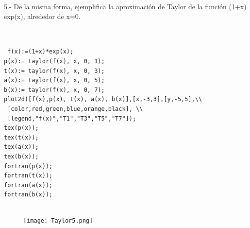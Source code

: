 \documentclass[12pt]{article}
\begin{document}
5.- De la misma forma, ejemplifica la aproximación de Taylor de la función
 (1+x) exp(x), alrededor de x=0.\\
 \begin{verbatim}


 f(x):=(1+x)*exp(x);
p(x):= taylor(f(x), x, 0, 1);
t(x):= taylor(f(x), x, 0, 3);
a(x):= taylor(f(x), x, 0, 5);
b(x):= taylor(f(x), x, 0, 7);
plot2d([f(x),p(x), t(x), a(x), b(x)],[x,-3,3],[y,-5,5],\\
 [color,red,green,blue,orange,black], \\
 [legend,"f(x)","T1","T3","T5","T7"]);
tex(p(x));
tex(t(x));
tex(a(x));
tex(b(x));
fortran(p(x));
fortran(t(x));
fortran(a(x));
fortran(b(x));


 \end{verbatim}




 \begin{center}
 \begin{figure}[b]
\texttt{[image: Taylor5.png]}
\end{figure}
 \end{center}
 
\end{document}
